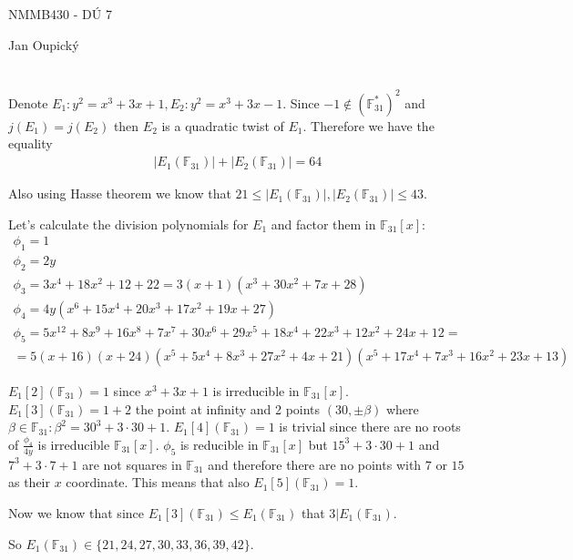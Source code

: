 \documentclass[12pt, a4paper]{article}
\begin{document}
\begin{center}
\large NMMB430 - DÚ 7

\normalsize Jan Oupický
\end{center}
\vspace{1\baselineskip}

\section{}
Denote $E_1: y^2=x^3+3x+1, E_2: y^2=x^3+3x-1$. Since $-1 \notin (\mathbb{F}_{31}^*)^2$ and $j(E_1)=j(E_2)$ then $E_2$ is a quadratic twist of $E_1$. Therefore we have the equality
\begin{gather*}
|E_1(\mathbb{F}_{31})|+|E_2(\mathbb{F}_{31})|=64
\end{gather*}

Also using Hasse theorem we know that $21 \leq |E_1(\mathbb{F}_{31})|,|E_2(\mathbb{F}_{31})| \leq 43$.

Let's calculate the division polynomials for $E_1$ and factor them in $\mathbb{F}_{31}[x]$:
\begin{gather*}
\phi_1= 1\\
\phi_2 = 2y\\
\phi_3 = 3x^4+18x^2+12+22 = 3(x+1)(x^3+30x^2+7x+28)\\
\phi_4 = 4y(x^6+15x^4+20x^3+17x^2+19x+27)\\
\phi_5 = 5x^{12}+8x^9+16x^8+7x^7+30x^6+29x^5+18x^4+22x^3+12x^2+24x+12 = \\
=5(x+16)(x+24)(x^5+5x^4+8x^3+27x^2+4x+21)(x^5+17x^4+7x^3+16x^2+23x+13)
\end{gather*}

$E_1[2](\mathbb{F}_{31})=1$ since $x^3+3x+1$ is irreducible in $\mathbb{F}_{31}[x]$. $E_1[3](\mathbb{F}_{31})=1+2$ the point at infinity and 2 points $(30,\pm \beta)$ where $\beta \in \mathbb{F}_{31}:\beta^2=30^3+3\cdot30+1$. $E_1[4](\mathbb{F}_{31})=1$ is trivial since there are no roots of $\frac{\phi_4}{4y}$ is irreducible $\mathbb{F}_{31}[x]$. $\phi_5$ is reducible in $\mathbb{F}_{31}[x]$ but $15^3+3\cdot30+1$ and $7^3+3\cdot7+1$ are not squares in $\mathbb{F}_{31}$ and therefore there are no points with $7$ or $15$ as their $x$ coordinate. This means that also $E_1[5](\mathbb{F}_{31})=1$.

Now we know that since $E_1[3](\mathbb{F}_{31}) \leq E_1(\mathbb{F}_{31})$ that $3|E_1(\mathbb{F}_{31})$. 

So $E_1(\mathbb{F}_{31}) \in \{21, 24, 27, 30, 33, 36, 39, 42\}$.
\end{document}
